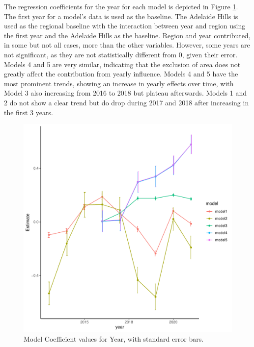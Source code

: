 \documentclass[review,12pt,authoryear]{elsarticle}
\begin{document}
\begin{linenumbers}
\begin{table}[]
{\begin{tabular}{@{}cccccccc@{}}
      \end{tabular}      
  }
\end{table}

The regression coefficients for the year for each model is depicted in Figure \ref{fig:yearly}. The first year for a model's data is used as the baseline. The Adelaide Hills is used as the regional baseline with the interaction between year and region using the first year and the Adelaide Hills as the baseline. Region and year contributed, in some but not all cases, more than the other variables. However, some years are not significant, as they are not statistically different from 0, given their error. Models 4 and 5 are very similar, indicating that the exclusion of area does not greatly affect the contribution from yearly influence. Models 4 and 5 have the most prominent trends, showing an increase in yearly effects over time, with Model 3 also increasing from 2016 to 2018 but plateau afterwards. Models 1 and 2 do not show a clear trend but do drop during 2017 and 2018 after increasing in the first 3 years.
\par
\begin{figure}
  \includegraphics{yearly_plots.pdf}
  \caption{Model Coefficient values for Year, with standard error bars.}\label{fig:yearly}
  \end{figure}


\end{linenumbers}
\end{document}
